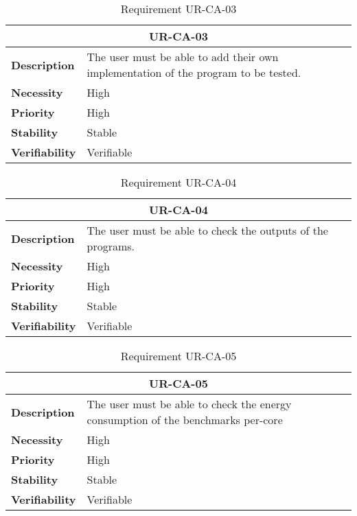 \begin{table}[H]
    \centering
    \begin{tabular}{l p{10cm}}
        \toprule
        \multicolumn{2}{c}{UR-CA-03} \\
        \toprule
        \textbf{Description}        & The user must be able to add their own implementation of the program to be tested. \\
        \textbf{Necessity}          &  High   \\
        \textbf{Priority}           &  High   \\
        \textbf{Stability}          &  Stable \\
        \textbf{Verifiability}       &  Verifiable \\
    \end{tabular}
    \caption{Requirement UR-CA-03}
    \label{tab:ur-ca-03}
\end{table}

\begin{table}[H]
    \centering
    \begin{tabular}{l p{10cm}}
        \toprule
        \multicolumn{2}{c}{UR-CA-04} \\
        \toprule
        \textbf{Description}        & The user must be able to check the outputs of the programs. \\
        \textbf{Necessity}          & High   \\
        \textbf{Priority}           & High   \\
        \textbf{Stability}          & Stable \\
        \textbf{Verifiability}      & Verifiable \\
    \end{tabular}
    \caption{Requirement UR-CA-04}
    \label{tab:ur-ca-04}
\end{table}

\begin{table}[H]
    \centering
    \begin{tabular}{l p{10cm}}
        \toprule
        \multicolumn{2}{c}{UR-CA-05} \\
        \toprule
        \textbf{Description}        & The user must be able to check the energy consumption of the benchmarks per-core\\
        \textbf{Necessity}          & High   \\
        \textbf{Priority}           & High   \\
        \textbf{Stability}          & Stable \\
        \textbf{Verifiability}      & Verifiable \\
    \end{tabular}
    \caption{Requirement UR-CA-05}
    \label{tab:ur-ca-05}
\end{table}


